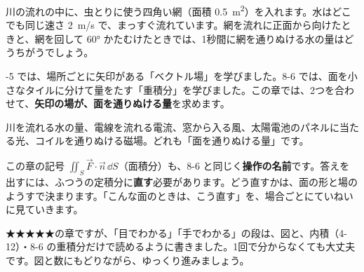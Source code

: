 \begin{hatena}
川の流れの中に、虫とりに使う四角い網（面積 \qty{0.5}{m^2}）を入れます。水はどこでも同じ速さ \qty{2}{m/s} で、まっすぐ流れています。網を流れに正面から向けたときと、網を回して \ang{60} かたむけたときでは、1秒間に網を通りぬける水の量はどうちがうでしょう。
\begin{bkfigure}
\end{bkfigure}
\end{hatena}

-5 では、場所ごとに矢印がある「ベクトル場」を学びました。8-6 では、面を小さなタイルに分けて量をたす「重積分」を学びました。この章では、2つを合わせて、\textbf{矢印の場が、面を通りぬける量}を求めます。

川を流れる水の量、電線を流れる電流、窓から入る風、太陽電池のパネルに当たる光、コイルを通りぬける磁場。どれも「面を通りぬける量」です。

この章の記号 $\iint_S\vec F\cdot\vec n\,\dd S$（面積分）も、8-6 と同じく\textbf{操作の名前}です。答えを出すには、ふつうの定積分に\textbf{直す}必要があります。どう直すかは、面の形と場のようすで決まります。「こんな面のときは、こう直す」を、場合ごとにていねいに見ていきます。

★★★★★の章ですが、「目でわかる」「手でわかる」の段は、図と、内積（4-12）・8-6 の重積分だけで読めるように書きました。1回で分からなくても大丈夫です。図と数にもどりながら、ゆっくり進みましょう。

